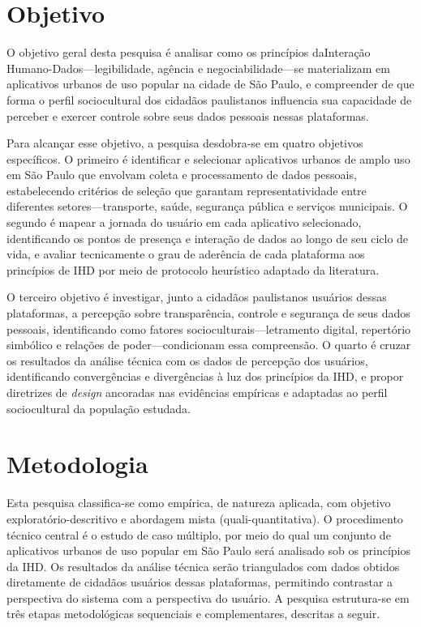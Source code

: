 \documentclass[
	12pt,				%
	oneside,			%
	a4paper,			%
	english,			%
	brazil				%
	]{abntex2ppgsi}
\begin{document}
    \section{Objetivo}

    O objetivo geral desta pesquisa é analisar como os princípios daInteração Humano-Dados---legibilidade, agência e negociabilidade---se materializam em aplicativos urbanos de uso popular na cidade de São Paulo, e compreender de que forma o perfil sociocultural dos cidadãos paulistanos influencia sua capacidade de perceber e exercer controle sobre seus dados pessoais nessas plataformas.

    Para alcançar esse objetivo, a pesquisa desdobra-se em quatro objetivos específicos. O primeiro é identificar e selecionar aplicativos urbanos de amplo uso em São Paulo que envolvam coleta e processamento de dados pessoais, estabelecendo critérios de seleção que garantam representatividade entre diferentes setores---transporte, saúde, segurança pública e serviços municipais. O segundo é mapear a jornada do usuário em cada aplicativo selecionado, identificando os pontos de presença e interação de dados ao longo de seu ciclo de vida, e avaliar tecnicamente o grau de aderência de cada plataforma aos princípios de IHD por meio de protocolo heurístico adaptado da literatura.

    O terceiro objetivo é investigar, junto a cidadãos paulistanos usuários dessas plataformas, a percepção sobre transparência, controle e segurança de seus dados pessoais, identificando como fatores socioculturais---letramento digital, repertório simbólico e relações de poder---condicionam essa compreensão. O quarto é cruzar os resultados da análise técnica com os dados de percepção dos usuários, identificando convergências e divergências à luz dos princípios da IHD, e propor diretrizes de \textit{design} ancoradas nas evidências empíricas e adaptadas ao perfil sociocultural da população estudada.
    
  \section{Metodologia}

    Esta pesquisa classifica-se como empírica, de natureza aplicada, com objetivo exploratório-descritivo e abordagem mista (quali-quantitativa). O procedimento técnico central é o estudo de caso múltiplo, por meio do qual um conjunto de aplicativos urbanos de uso popular em São Paulo será analisado sob os princípios da IHD. Os resultados da análise técnica serão triangulados com dados obtidos diretamente de cidadãos usuários dessas plataformas, permitindo contrastar a perspectiva do sistema com a perspectiva do usuário. A pesquisa estrutura-se em três etapas metodológicas sequenciais e complementares, descritas a seguir.
\end{document}
